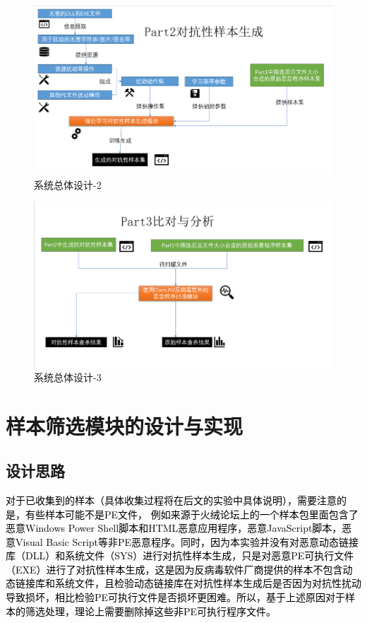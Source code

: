 \begin{figure}
  \centering
  \includegraphics[]{images/system_design2.png}
  \caption{系统总体设计-2}\label{fig:system_design2}
\end{figure}

\begin{figure}
  \centering
  \includegraphics[]{images/system_design3.png}
  \caption{系统总体设计-3}\label{fig:system_design3}
\end{figure}

\section{样本筛选模块的设计与实现}

\subsection{设计思路}

\textcolor{black}{对于已收集到的样本（具体收集过程将在后文的实验中具体说明），需要注意的是，有些样本可能不是PE文件， 例如来源于火绒论坛上的一个样本包里面包含了恶意Windows Power Shell脚本和HTML恶意应用程序，恶意JavaScript脚本，恶意Visual Basic Script等非PE恶意程序。同时，因为本实验并没有对恶意动态链接库（DLL）和系统文件（SYS）进行对抗性样本生成，只是对恶意PE可执行文件（EXE）进行了对抗性样本生成，这是因为反病毒软件厂商提供的样本不包含动态链接库和系统文件，且检验动态链接库在对抗性样本生成后是否因为对抗性扰动导致损坏，相比检验PE可执行文件是否损坏更困难。所以，基于上述原因对于样本的筛选处理，理论上需要删除掉这些非PE可执行程序文件。}

